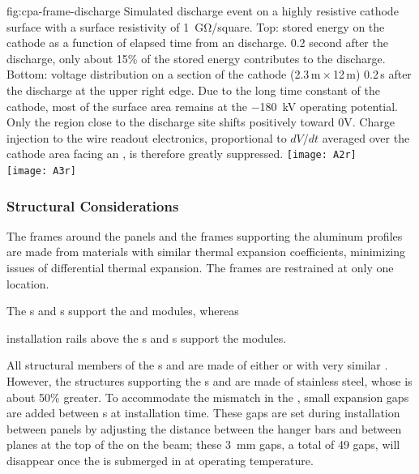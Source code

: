 \begin{dunefigure}
{fig:cpa-frame-discharge}
{Simulated discharge event on a highly resistive cathode surface with a surface resistivity of \SI{1}{\giga\ohm}/square. Top:  stored energy on the cathode as a function of elapsed time from an  discharge. 0.2 second after the discharge, only about 15\% of the stored energy contributes to the discharge. Bottom: voltage distribution on a section of the cathode (2.3\,m\,$\times$\,12\,m) 0.2\,s after the discharge at the upper right edge.  Due to the long time constant of the cathode, most of the surface area remains at the \SI{-180}{\kV} operating potential. Only the region close to the discharge site shifts positively toward 0V. Charge injection to the wire readout electronics, proportional to $dV/dt$ averaged over the cathode area facing an , is therefore greatly suppressed. }
\centering
\texttt{[image: A2r]} \\ \vspace{20pt}    %
\texttt{[image: A3r]}
\end{dunefigure}


\subsubsection{Structural Considerations}
\label{sec:fdsp-hv-des-des-sc}

The frames around the  panels and the frames supporting the  aluminum profiles  
are made from materials with similar thermal expansion coefficients, minimizing issues of differential thermal expansion. The  frames 
are restrained at only one location.  


The s and s support the  and  modules, whereas

installation rails above the s and s support the  modules. 

All structural members of the s and  are made of either \frfour or  with very similar . However, the structures supporting the s and  are made of stainless steel, whose  is about 50\% greater.  To accommodate the mismatch in the , small expansion gaps are added between s at installation time. These gaps are set during installation between  panels by adjusting the distance between the  hanger bars and between  planes at the top of the  on the  beam; these \SI{3}{mm} gaps, a total of 49 gaps, will disappear once the  is submerged in \lar at operating temperature.
 
